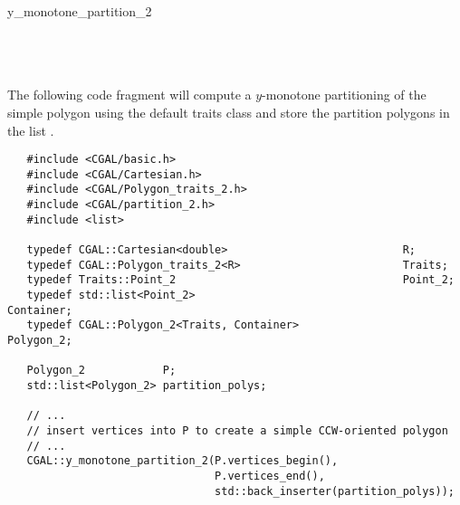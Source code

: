 \begin{ccRefFunction}{y_monotone_partition_2}
\ccSeeAlso
{} \\
 \\
 \\
 \\

\ccExample


The following code fragment will compute a $y$-monotone partitioning
of the simple polygon  using the default
traits class and store the partition polygons in the list 
.

\begin{verbatim}
   #include <CGAL/basic.h>
   #include <CGAL/Cartesian.h>
   #include <CGAL/Polygon_traits_2.h>
   #include <CGAL/partition_2.h>
   #include <list>

   typedef CGAL::Cartesian<double>                           R;
   typedef CGAL::Polygon_traits_2<R>                         Traits;
   typedef Traits::Point_2                                   Point_2;
   typedef std::list<Point_2>                                Container;
   typedef CGAL::Polygon_2<Traits, Container>                Polygon_2;

   Polygon_2            P;
   std::list<Polygon_2> partition_polys;

   // ...
   // insert vertices into P to create a simple CCW-oriented polygon
   // ...
   CGAL::y_monotone_partition_2(P.vertices_begin(),
                                P.vertices_end(),
                                std::back_inserter(partition_polys));
\end{verbatim}



\end{ccRefFunction}
